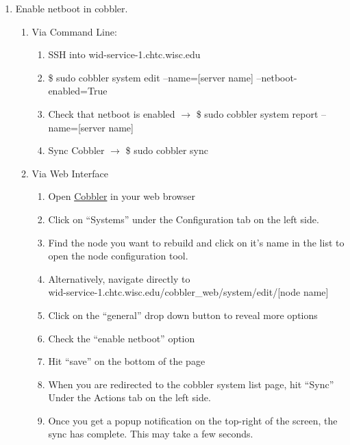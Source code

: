 \documentclass[10pt,letterpaper]{article}
\begin{document}
    \begin{enumerate}
        \item Enable netboot in cobbler.
        \begin{enumerate}
            \item Via Command Line:
            \begin{enumerate}
                \item SSH into wid-service-1.chtc.wisc.edu
                \item {\selectfont \$ sudo cobbler system edit
                --name=[server name] --netboot-enabled=True }
                \item Check that netboot is enabled $\rightarrow$
                {\selectfont \$ sudo cobbler system report
                --name=[server name] }
                \item Sync Cobbler $\rightarrow$ {\selectfont
                \$ sudo cobbler sync }
            \end{enumerate}
            \item Via Web Interface
            \begin{enumerate}
                \item Open \href{https://wid-service-1.chtc.wisc.edu/cobbler_web}{Cobbler}
                in your web browser
                \item Click on “Systems” under the Configuration tab on the left side.
                \item Find the node you want to rebuild and click on it’s name in
                the list to open the node configuration tool.
                \item Alternatively, navigate directly to \\
                wid-service-1.chtc.wisc.edu/cobbler\_web/system/edit/[node name]
                \item Click on the “general” drop down button to reveal more options
                \item Check the “enable netboot” option
                \item Hit “save” on the bottom of the page
                \item When you are redirected to the cobbler system list page,
                hit “Sync” Under the Actions tab on the left side.
                \item Once you get a popup notification on the top-right of the
                screen, the sync has complete. This may take a few seconds.

\end{enumerate}
\end{enumerate}
\end{enumerate}
\end{document}
